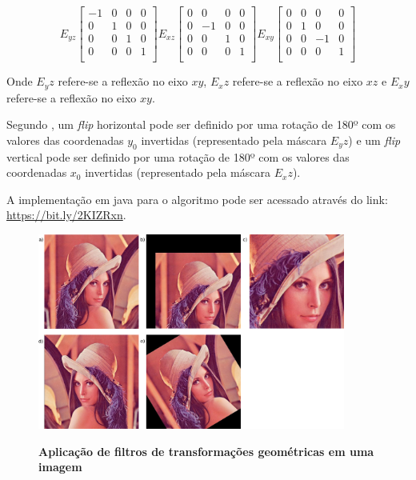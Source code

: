 \documentclass[
	12pt,				%
	oneside,			%
	a4paper,			%
	english,			%
	french,				%
	spanish,			%
	brazil,				%
	]{abntex2}
\begin{document}
\[
E_{yz}
\begin{bmatrix}
    -1 & 0 & 0 & 0   \\ 
	 0 & 1 & 0 & 0   \\ 
	 0 & 0 & 1 & 0   \\ 
	 0 & 0 & 0 & 1   \\ 
\end{bmatrix} 
E_{xz}
\begin{bmatrix}
    0 &  0 & 0 & 0   \\ 
	0 & -1 & 0 & 0   \\ 
	0 &  0 & 1 & 0   \\ 
	0 &  0 & 0 & 1   \\ 
\end{bmatrix} 
E_{xy}
\begin{bmatrix}
    0 & 0 &  0 & 0   \\ 
	0 & 1 &  0 & 0   \\ 
	0 & 0 & -1 & 0   \\ 
	0 & 0 &  0 & 1   \\ 
\end{bmatrix} 
\]

Onde \(E_yz\) refere-se a reflexão no eixo \(xy\), \(E_xz\) refere-se a reflexão no eixo \(xz\) e \(E_xy\) refere-se a reflexão no eixo \(xy\).

Segundo \citet{conciAzevedoLeta:2008}, um \textit{flip} horizontal pode ser definido por uma rotação de 180º com os valores das coordenadas \(y_0\) invertidas (representado pela máscara \(E_yz\)) e um \textit{flip} vertical pode ser definido por uma rotação de 180º com os valores das coordenadas \(x_0\) invertidas (representado pela máscara \(E_xz\)).

A implementação em java para o algoritmo pode ser acessado através do link: \url{https://bit.ly/2KIZRxn}.

\begin{figure}[ht]
\centering
\caption{\textbf{Aplicação de filtros de transformações geométricas em uma imagem}}
\includegraphics[width=0.9\textwidth]{imagens/transformacoesgeometricas.png}
\sourceAuthor
\label{fig:transformacoesgeometricas}
\end{figure}
\end{document}
